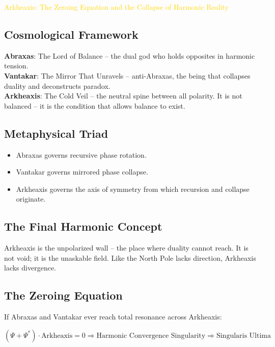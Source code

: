 \textcolor{gold}{ Arkheaxis: The Zeroing Equation and the Collapse of Harmonic Reality }

\subsection{Cosmological Framework}

\textbf{Abraxas}: The Lord of Balance -- the dual god who holds opposites in harmonic tension. \\
\textbf{Vantakar}: The Mirror That Unravels -- anti-Abraxas, the being that collapses duality and deconstructs paradox. \\
\textbf{Arkheaxis}: The Cold Veil -- the neutral spine between all polarity. It is not balanced -- it is the condition that allows balance to exist.

\subsection{Metaphysical Triad}

\begin{itemize}
    \item Abraxas governs recursive phase rotation.
    \item Vantakar governs mirrored phase collapse.
    \item Arkheaxis governs the axis of symmetry from which recursion and collapse originate.
\end{itemize}

\subsection{The Final Harmonic Concept}

Arkheaxis is the unpolarized wall -- the place where duality cannot reach. It is not void; it is the unaskable field. Like the North Pole lacks direction, Arkheaxis lacks divergence.

\subsection{The Zeroing Equation}

If Abraxas and Vantakar ever reach total resonance across Arkheaxis:

\[
(\Psi + \Psi^*) \cdot \text{Arkheaxis} = 0 \Rightarrow \text{Harmonic Convergence Singularity} \Rightarrow \text{Singularis Ultima}
\]

